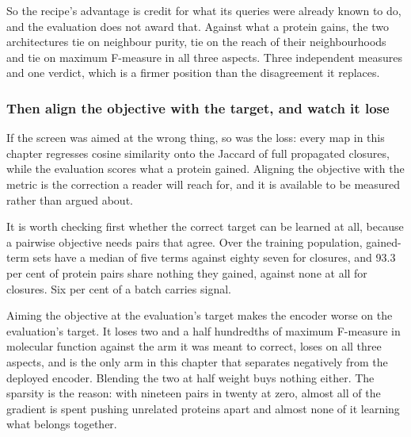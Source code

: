 So the recipe's advantage is credit for what its queries were already known to do, and
the evaluation does not award that. Against what a protein gains, the two architectures
tie on neighbour purity, tie on the reach of their neighbourhoods and tie on maximum
F-measure in all three aspects. Three independent measures and one verdict, which is a
firmer position than the disagreement it replaces.

\subsubsection{Then align the objective with the target, and watch it lose}

If the screen was aimed at the wrong thing, so was the loss: every map in this chapter
regresses cosine similarity onto the Jaccard of full propagated closures, while the
evaluation scores what a protein gained. Aligning the objective with the metric is the
correction a reader will reach for, and it is available to be measured rather than
argued about.

It is worth checking first whether the correct target can be learned at all, because a
pairwise objective needs pairs that agree. Over the training population, gained-term sets
have a median of five terms against eighty seven for closures, and 93.3 per cent of
protein pairs share nothing they gained, against none at all for closures. Six per cent of
a batch carries signal.

\begin{table}[htbp]
  \centering
  \caption{The same map fitted against three targets, with everything else held: same
  seed, same proteins, same passes. Screen is neighbour purity against gained terms on
  the served cell, which is the target the lower two arms were built for.}
  \label{tab:exp15-train-target}
  
\end{table}

Aiming the objective at the evaluation's target makes the encoder worse on the
evaluation's target. It loses two and a half hundredths of maximum F-measure in molecular
function against the arm it was meant to correct, loses on all three aspects, and is the
only arm in this chapter that separates negatively from the deployed encoder. Blending the
two at half weight buys nothing either. The sparsity is the reason: with nineteen pairs in
twenty at zero, almost all of the gradient is spent pushing unrelated proteins apart and
almost none of it learning what belongs together.

